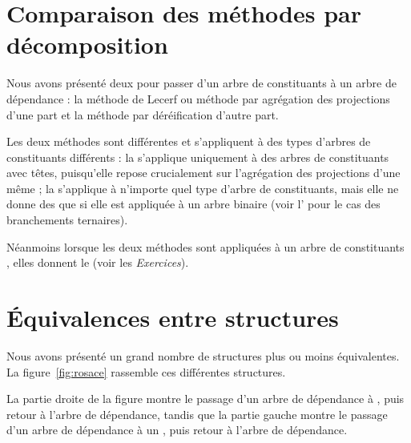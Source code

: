 \section{Comparaison des méthodes par décomposition}\label{sec:3.4.24}

Nous avons présenté deux  pour passer d’un arbre de constituants à un arbre de dépendance : la méthode de Lecerf ou méthode par agrégation des projections d’une part et la méthode par déréification d’autre part.

Les deux méthodes sont différentes et s’appliquent à des types d’arbres de constituants différents : la  s’applique uniquement à des arbres de constituants avec têtes, puisqu’elle repose crucialement sur l’agrégation des projections d’une même ; la  s’applique à n’importe quel type d’arbre de constituants, mais elle ne donne des  que si elle est appliquée à un arbre binaire (voir l’ pour le cas des branchements ternaires).

Néanmoins lorsque les deux méthodes sont appliquées à un arbre de constituants , elles donnent le  (voir les \textit{Exercices}).

\section{Équivalences entre structures}\label{sec:3.4.25}

Nous avons présenté un grand nombre de structures plus ou moins équivalentes. La figure~\ref{fig:rosace} rassemble ces différentes structures.

La partie droite de la figure montre le passage d’un arbre de dépendance à , puis retour à l’arbre de dépendance, tandis que la partie gauche montre le passage d’un arbre de dépendance à un , puis retour à l’arbre de dépendance.

